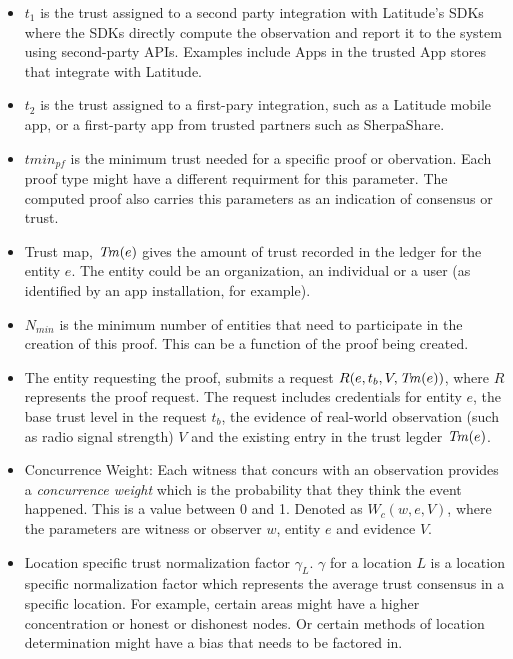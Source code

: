 \begin{itemize}
    \item $t_1$ is the trust assigned to a second party integration with Latitude's SDKs where the SDKs directly compute the
        observation and report it to the system using second-party APIs. Examples include Apps in the trusted App stores
        that integrate with Latitude.
    \item $t_2$ is the trust assigned to a first-pary integration, such as a Latitude mobile app, or a first-party app
        from trusted partners such as SherpaShare.
    \item $tmin_{pf}$ is the minimum trust needed for a specific proof or obervation. Each proof type might have a
        different requirment for this parameter. The computed proof also carries this parameters as an indication of
        consensus or trust.
    \item Trust map, $\mathit{Tm}(e)$ gives the amount of trust recorded in the ledger for the entity $e$. The entity could be an
        organization, an individual or a user (as identified by an app installation, for example).
    \item $N_{min}$ is the minimum number of entities that need to participate in the creation of this proof. This can
        be a function of the proof being created.
    \item The entity requesting the proof, submits a request $R(e, t_b, V, \mathit{Tm}(e))$, where $R$ represents the proof
        request. The request includes credentials for entity $e$, the base trust level in the request $t_b$, the
        evidence of real-world observation (such as radio signal strength) $V$ and the existing entry in the trust
        legder $\mathit{Tm}(e)$.
    \item Concurrence Weight: Each witness that concurs with an observation provides a {\em concurrence weight} which is
        the probability that they think the event happened. This is a value between 0 and 1. Denoted as $W_c(w, e, V)$,
        where the parameters are witness or observer $w$, entity $e$ and evidence $V$.
    \item Location specific trust normalization factor $\gamma_L$. $\gamma$ for a location $L$ is a location specific
        normalization factor which represents the average trust consensus in a specific location. For example, certain
        areas might have a higher concentration or honest or dishonest nodes. Or certain methods of location
        determination might have a bias that needs to be factored in.
\end{itemize}

